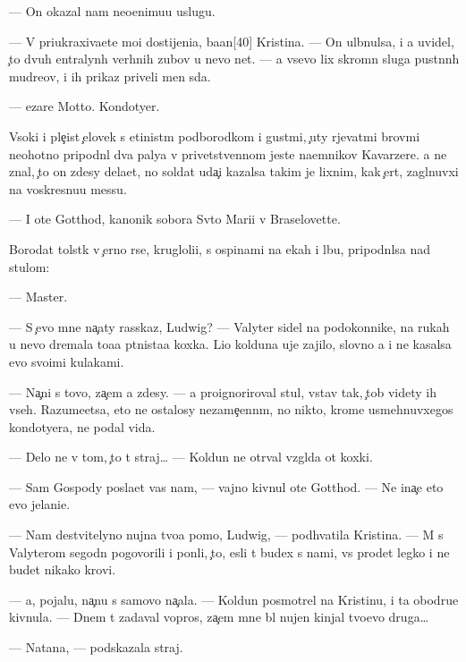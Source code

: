 \documentclass[10pt]{book}
\begin{document}
— On okazal nam neo{\q}enimu{\y}u uslugu.

— V{\yi} priukraxiva{\y}ete mo{\y}i dostijeni{\y}a, ba{\y}an[40] Kristina. — On ul{\yi}bnulsa, i {\y}a uvidel, {\c}to dvuh {\q}entralyn{\yi}h verhnih zubov u nevo net. — {\Y}a vsevo lix skromn{\yi}{\y} sluga pust{\yi}nn{\yi}h mudre{\q}ov, i ih prikaz{\yi} priveli men{\ia} s{\iu}da.

— {\C}ezare Motto. Kondotyer.

V{\yi}soki{\y} i ple{\c}ist{\yi}{\y} {\c}elovek s {\x}etinist{\yi}m podborodkom i gust{\yi}mi, {\c}uty r{\yi}jevat{\yi}mi brov{\ia}mi neohotno pripodn{\ia}l dva paly{\q}a v privetstvennom jeste na{\y}emnikov Kavarzere. {\Y}a ne znal, {\c}to on zdesy dela{\y}et, no soldat uda{\c}i kazalsa takim je lixnim, kak {\c}ert, zagl{\ia}nuvxi{\y} na voskresnu{\y}u messu.

— I ote{\q} Gotthod, kanonik sobora Sv{\ia}to{\y} Mari{\y}i v Braselovette.

Borodat{\yi}{\y} tolst{\ia}k v {\c}erno{\y} r{\ia}se, krugloli{\q}i{\y}, s ospinami na {\x}ekah i lbu, pripodn{\ia}lsa nad stulom:

— Master.

— S {\c}evo mne na{\c}aty rasskaz, Ludwig? — Valyter sidel na podokonnike, na rukah u nevo dremala to{\x}a{\y}a p{\ia}tnista{\y}a koxka. Li{\q}o kolduna uje zajilo, slovno {\y}a i ne kasalsa {\y}evo svo{\y}imi kulakami.

— Na{\c}ni s tovo, za{\c}em {\y}a zdesy. — {\Y}a pro{\y}ignoriroval stul, vstav tak, {\c}tob{\yi} videty ih vseh. Razume{\y}etsa, eto ne ostalosy nezame{\c}enn{\yi}m, no nikto, krome usmehnuvxegos{\ia} kondotyera, ne podal vida.

— Delo ne v tom, {\c}to t{\yi} straj… — Koldun ne otr{\yi}val vzgl{\ia}da ot koxki.

— Sam Gospody pos{\yi}la{\y}et vas nam, — vajno kivnul ote{\q} Gotthod. — Ne ina{\c}e eto {\y}evo jelani{\y}e.

— Nam de{\y}stvitelyno nujna tvo{\y}a pomo{\x}, Ludwig, — podhvatila Kristina. — M{\yi} s Valyterom segodn{\ia} pogovorili i pon{\ia}li, {\c}to, {\y}esli t{\yi} budex s nami, vs{\e} pro{\y}det legko i ne budet nikako{\y} krovi.

— {\Y}a, pojalu{\y}, na{\c}nu s samovo na{\c}ala. — Koldun posmotrel na Kristinu, i ta obodr{\ia}{\y}u{\x}e kivnula. — Dnem t{\yi} zadaval vopros, za{\c}em mne b{\yi}l nujen kinjal tvo{\y}evo druga…

— Natana, — podskazala straj.
\end{document}
